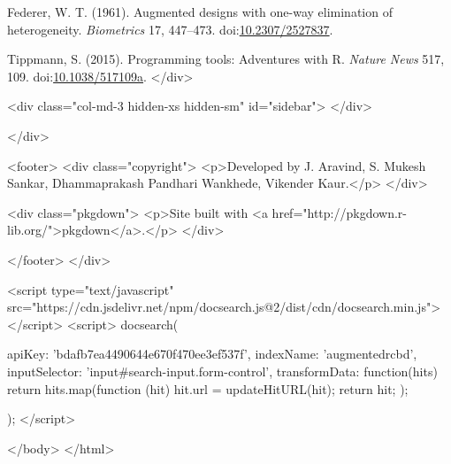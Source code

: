 \leavevmode\hypertarget{ref-federer_augmented_1961}{}%
Federer, W. T. (1961). Augmented designs with one-way elimination of
heterogeneity. \emph{Biometrics} 17, 447--473.
doi:\href{https://doi.org/10.2307/2527837}{10.2307/2527837}.

\leavevmode\hypertarget{ref-tippmann_programming_2015}{}%
Tippmann, S. (2015). Programming tools: Adventures with R. \emph{Nature
News} 517, 109.
doi:\href{https://doi.org/10.1038/517109a}{10.1038/517109a}.
  </div>

  <div class="col-md-3 hidden-xs hidden-sm" id="sidebar">
      </div>

</div>


      <footer>
      <div class="copyright">
  <p>Developed by J. Aravind, S. Mukesh Sankar, Dhammaprakash Pandhari Wankhede, Vikender Kaur.</p>
</div>

<div class="pkgdown">
  <p>Site built with <a href="http://pkgdown.r-lib.org/">pkgdown</a>.</p>
</div>

      </footer>
   </div>

  
<script type="text/javascript" src="https://cdn.jsdelivr.net/npm/docsearch.js@2/dist/cdn/docsearch.min.js"></script>
<script>
  docsearch({
    
    
    apiKey: 'bdafb7ea4490644e670f470ee3ef537f',
    indexName: 'augmentedrcbd',
    inputSelector: 'input#search-input.form-control',
    transformData: function(hits) {
      return hits.map(function (hit) {
        hit.url = updateHitURL(hit);
        return hit;
      });
    }
  });
</script>


  </body>
</html>


